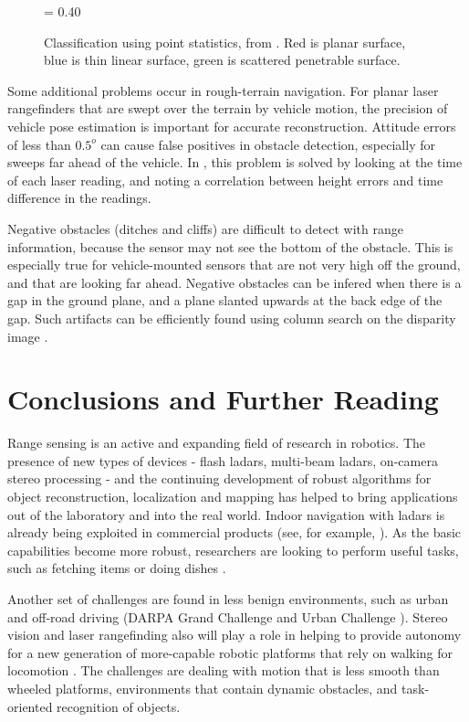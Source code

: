 \documentclass[twocolumn,oneside]{book}
\begin{document}
\begin{figure}[hbt]
{\epsfxsize = 0.40\textwidth {}}
\caption{Classification using point statistics, from
\cite{vandapel06}.  Red is planar surface, blue is thin linear
surface, green is scattered penetrable surface.
\label{point_classified.ch31}}
\end{figure}

Some additional problems occur in  rough-terrain navigation.  For
planar laser rangefinders that are swept over the terrain by vehicle
motion, the precision of vehicle pose estimation is important for
accurate reconstruction.  Attitude errors of less than $0.5^o$ can
cause false positives in obstacle detection, especially for sweeps far
ahead of the vehicle.  In \cite{thrun06}, this problem is solved by
looking at the time of each laser reading, and noting a correlation
between height errors and time difference in the readings.

Negative  obstacles (ditches and cliffs) are difficult to detect with
range information, because the sensor may not see the bottom of the
obstacle.  This is especially true for vehicle-mounted sensors that
are not very high off the ground, and that are looking far ahead.
Negative obstacles can be infered when there is a gap in the ground
plane, and a plane slanted upwards at the back edge of the gap.  Such
artifacts can be efficiently found using column search on the
disparity image \cite{bellutta00}.

\section{Conclusions and Further Reading}

Range sensing is an active and expanding field of research in
robotics.  The presence of new types of devices - flash ladars,
multi-beam ladars, on-camera stereo processing - and the continuing
development of robust algorithms for object reconstruction,
localization and mapping has helped to bring applications out of the
laboratory and into the real world.  Indoor navigation with ladars is
already being exploited in commercial products (see, for example,
\cite{karto}).  As the basic capabilities become more robust,
researchers are looking to perform useful tasks, such as fetching
items or doing dishes \cite{STAIR}.

Another set of challenges are found in less benign
environments, such as urban and off-road driving (DARPA Grand
Challenge and Urban Challenge \cite{GrandChallenge}).  Stereo vision
and laser rangefinding also will play a role in helping to provide
autonomy for a new generation of more-capable robotic platforms that
rely on walking for locomotion \cite{cmu-humanoid}.  The challenges are
dealing with motion that is less smooth than wheeled platforms,
environments that contain dynamic obstacles, and task-oriented
recognition of objects.  
\end{document}
